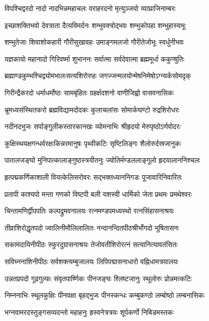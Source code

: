\twolineshloka
{विपश्चिद्वरदो नादो नादभिन्नमहाचलः}
{वराहरदनो मृत्युञ्जयो व्याघ्राजिनाम्बरः}

\twolineshloka
{इच्छाशक्तिभवो देवत्राता दैत्यविमर्दनः}
{शम्भुवक्त्रोद्भवः शम्भुकोपहा शम्भुहास्यभूः}

\twolineshloka
{शम्भुतेजाः शिवाशोकहारी गौरीसुखावहः}
{उमाङ्गमलजो गौरीतेजोभूः स्वर्धुनीभवः}

\twolineshloka
{यज्ञकायो महानादो गिरिवर्ष्मा शुभाननः}
{सर्वात्मा सर्वदेवात्मा ब्रह्ममूर्धा ककुप्श्रुतिः}

\twolineshloka
{ब्रह्माण्डकुम्भश्चिद्व्योमभालःसत्यशिरोरुहः}
{जगज्जन्मलयोन्मेषनिमेषोऽग्न्यर्कसोमदृक्}

\twolineshloka
{गिरीन्द्रैकरदो धर्माधर्मोष्ठः सामबृंहितः}
{ग्रहर्क्षदशनो वाणीजिह्वो वासवनासिकः}

\twolineshloka
{भ्रूमध्यसंस्थितकरो ब्रह्मविद्यामदोदकः}
{कुलाचलांसः सोमार्कघण्टो रुद्रशिरोधरः}

\twolineshloka
{नदीनदभुजः सर्पाङ्गुलीकस्तारकानखः}
{व्योमनाभिः श्रीहृदयो मेरुपृष्ठोऽर्णवोदरः}

\twolineshloka
{कुक्षिस्थयक्षगन्धर्वरक्षःकिन्नरमानुषः}
{पृथ्वीकटिः सृष्टिलिङ्गः शैलोरुर्दस्रजानुकः}

\twolineshloka
{पातालजङ्घो मुनिपात्कालाङ्गुष्ठस्त्रयीतनुः}
{ज्योतिर्मण्डललाङ्गूलो हृदयालाननिश्चलः}

\twolineshloka
{हृत्पद्मकर्णिकाशाली वियत्केलिसरोवरः}
{सद्भक्तध्याननिगडः पूजावारिनिवारितः}

\twolineshloka
{प्रतापी काश्यपो मन्ता गणको विष्टपी बली}
{यशस्वी धार्मिको जेता प्रथमः प्रमथेश्वरः}

\twolineshloka
{चिन्तामणिर्द्वीपपतिः कल्पद्रुमवनालयः}
{रत्नमण्डपमध्यस्थो रत्नसिंहासनाश्रयः}

\twolineshloka
{तीव्राशिरोद्धृतपदो ज्वालिनीमौलिलालितः}
{नन्दानन्दितपीठश्रीर्भोगदो भूषितासनः}

\twolineshloka
{सकामदायिनीपीठः स्फुरदुग्रासनाश्रयः}
{तेजोवतीशिरोरत्नं सत्यानित्यावतंसितः}

\twolineshloka
{सविघ्ननाशिनीपीठः सर्वशक्त्यम्बुजालयः}
{लिपिपद्मासनाधारो वह्निधामत्रयालयः}

\twolineshloka
{उन्नतप्रपदो गूढगुल्फः संवृतपार्ष्णिकः}
{पीनजङ्घः श्लिष्टजानुः स्थूलोरुः प्रोन्नमत्कटिः}

\twolineshloka
{निम्ननाभिः स्थूलकुक्षिः पीनवक्षा बृहद्भुजः}
{पीनस्कन्धः कम्बुकण्ठो लम्बोष्ठो लम्बनासिकः}

\twolineshloka
{भग्नवामरदस्तुङ्गसव्यदन्तो महाहनुः}
{ह्रस्वनेत्रत्रयः शूर्पकर्णो निबिडमस्तकः}

